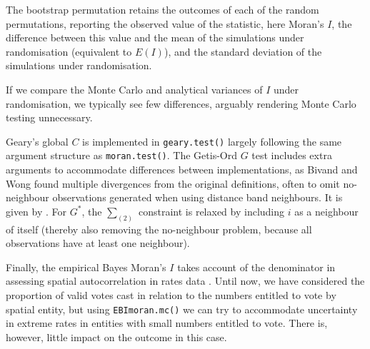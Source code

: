 \documentclass[]{book}
\newenvironment{Shaded}{\begin{snugshade}}{\end{snugshade}}
\newcommand{\CommentTok}[1]{\textcolor[rgb]{0.56,0.35,0.01}{\textit{#1}}}
\newcommand{\DataTypeTok}[1]{\textcolor[rgb]{0.13,0.29,0.53}{#1}}
\newcommand{\DecValTok}[1]{\textcolor[rgb]{0.00,0.00,0.81}{#1}}
\newcommand{\KeywordTok}[1]{\textcolor[rgb]{0.13,0.29,0.53}{\textbf{#1}}}
\newcommand{\NormalTok}[1]{#1}
\newcommand{\OperatorTok}[1]{\textcolor[rgb]{0.81,0.36,0.00}{\textbf{#1}}}
\newcommand{\OtherTok}[1]{\textcolor[rgb]{0.56,0.35,0.01}{#1}}
\newcommand{\StringTok}[1]{\textcolor[rgb]{0.31,0.60,0.02}{#1}}
\begin{document}
\begin{Shaded}
\end{Shaded}

The bootstrap permutation retains the outcomes of each of the random permutations, reporting the observed value of the statistic, here Moran's \(I\), the difference between this value and the mean of the simulations under randomisation (equivalent to \(E(I)\)), and the standard deviation of the simulations under randomisation.

If we compare the Monte Carlo and analytical variances of \(I\) under randomisation, we typically see few differences, arguably rendering Monte Carlo testing unnecessary.

\begin{Shaded}
\end{Shaded}

Geary's global \(C\) is implemented in \texttt{geary.test()} largely following the same argument structure as \texttt{moran.test()}. The Getis-Ord \(G\) test includes extra arguments to accommodate differences between implementations, as Bivand and Wong \citeyearpar{Bivand2018} found multiple divergences from the original definitions, often to omit no-neighbour observations generated when using distance band neighbours. It is given by \citep[page 194]{getis+ord:92}. For \(G^*\), the \(\sum_{(2)}\) constraint is relaxed by including \(i\) as a neighbour of itself (thereby also removing the no-neighbour problem, because all observations have at least one neighbour).

Finally, the empirical Bayes Moran's \(I\) takes account of the denominator in assessing spatial autocorrelation in rates data \citep{assuncao+reis:99}. Until now, we have considered the proportion of valid votes cast in relation to the numbers entitled to vote by spatial entity, but using \texttt{EBImoran.mc()} we can try to accommodate uncertainty in extreme rates in entities with small numbers entitled to vote. There is, however, little impact on the outcome in this case.
\end{document}
